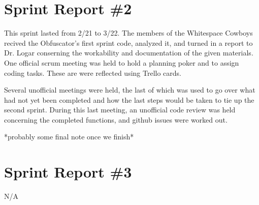 \section{Sprint Report \#2}
This sprint lasted from 2/21 to 3/22. The members of the Whitespace Cowboys recived the Obfuscator's first sprint code, 
analyzed it, and turned in a report to Dr. Logar conserning the workability and documentation of the given materials. 
One official scrum meeting was held to hold a planning poker and to assign coding tasks. These are were reflected using 
Trello cards. 

Several unofficial meetings were held, the last of which was used to go over what had not yet been 
completed and how the last steps would be taken to tie up the second sprint. During this last meeting, an unofficial 
code review was held concerning the completed functions, and github issues were worked out.

*probably some final note once we finish*

\section{Sprint Report \#3}
N/A

